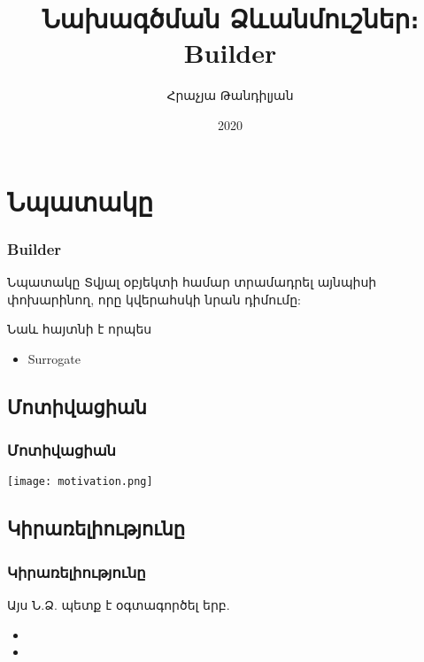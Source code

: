 \documentclass{beamer}
\begin{document}
\title[Builder]{Նախագծման Ձևանմուշներ։ Builder}
\author[Հրաչյա Թանդիլյան\copyright]{Հրաչյա Թանդիլյան}
\date{2020}

\begin{frame}
\titlepage
\end{frame}

\section{Նպատակը}
\begin{frame}\frametitle{Builder}
\begin{block}{Նպատակը}
    Տվյալ օբյեկտի համար տրամադրել այնպիսի փոխարինող, որը կվերահսկի նրան դիմումը:
\end{block}
\vfill
Նաև հայտնի է որպես
\begin{itemize}
    \item Surrogate
\end{itemize}
\end{frame}

\subsection{Մոտիվացիան}
\begin{frame}\frametitle{Մոտիվացիան}
\begin{center}
    \texttt{[image: motivation.png]}
\end{center}
\end{frame}

\subsection{Կիրառելիությունը}
\begin{frame}\frametitle{Կիրառելիությունը}
Այս Ն.Ձ. պետք է օգտագործել երբ.
\vspace{0.5cm}
\begin{itemize}
    \item
    \item
\end{itemize}
\end{frame}
\end{document}
